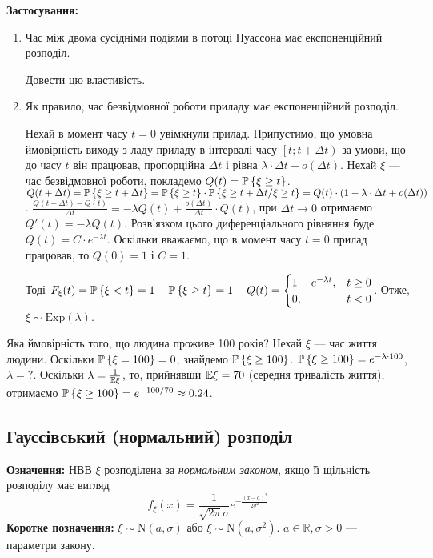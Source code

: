 \noindent\textbf{Застосування:}
\begin{enumerate}
    \item Час між двома сусідніми подіями в потоці Пуассона має експоненційний розподіл.
    \begin{exercise}
        Довести цю властивість.
    \end{exercise}
    \item Як правило, час безвідмовної роботи приладу має експоненційний розподіл.
    
    Нехай в момент часу $t=0$ увімкнули прилад. Припустимо, що умовна ймовірність виходу з ладу
    приладу в інтервалі часу $\left[ t; t+\Delta t\right)$ за умови, що до часу $t$ він працював,
    пропорційна $\Delta t$ і рівна $\lambda\cdot \Delta t + o(\Delta t)$. Нехай $\xi$ --- час безвідмовної роботи,
    покладемо $Q(t) = \P\left\{\xi \geq t\right\}$.
    $Q(t+\Delta t) = \P\left\{\xi \geq t + \Delta t\right\} = \P\left\{\xi \geq t\right\} \cdot \P\left\{\xi \geq t+\Delta t / \xi \geq t\right\} = 
    Q(t) \cdot (1 - \lambda\cdot \Delta t + o(\Delta t))$.
    $\frac{Q(t+\Delta t) - Q(t)}{\Delta t} = -\lambda Q(t) + \frac{o(\Delta t)}{\Delta t} \cdot Q(t)$,
    при $\Delta t \rightarrow 0$ отримаємо $Q'(t) = -\lambda Q(t)$.
    Розв'язком цього диференціального рівняння буде $Q(t) = C\cdot e^{-\lambda t}$.
    Оскільки вважаємо, що в момент часу $t=0$ прилад працював, то $Q(0) = 1$ і $C=1$.

    Тоді $F_\xi(t) = \P\left\{ \xi < t\right\} = 1 - \P\left\{ \xi \geq t\right\} = 1 - Q(t) = \begin{cases}
        1 - e^{-\lambda t}, & t \geq 0 \\
        0, & t < 0
    \end{cases}$. Отже, $\xi \sim \mathrm{Exp}(\lambda)$.
\end{enumerate}

\begin{example}
    Яка ймовірність того, що людина проживе 100 років? Нехай $\xi$ --- час життя людини.
    Оскільки $\P\left\{\xi = 100\right\} = 0$, знайдемо $\P\left\{ \xi \geq 100\right\}$.
    $\P\left\{ \xi \geq 100\right\} = e^{-\lambda \cdot 100}$, $\lambda = \text{?}$.
    Оскільки $\lambda = \frac{1}{\E\xi}$, то, прийнявши $\E\xi = 70$ (середня тривалість життя),
    отримаємо $\P\left\{ \xi \geq 100\right\} = e^{-100/70} \approx 0.24$.
\end{example}

\subsection{Гауссівський (нормальний) розподіл}
\noindent\textbf{Означення:}
    НВВ $\xi$ розподілена за \emph{нормальним законом}, 
    якщо її щільність розподілу має вигляд 
    \begin{equation}
        f_\xi(x) = \frac{1}{\sqrt{2\pi}\sigma} e^{-\frac{(x-a)^2}{2\sigma^2}}
    \end{equation}
\textbf{Коротке позначення:} $\xi \sim \mathrm{N}(a, \sigma)$ або 
    $\xi \sim \mathrm{N}(a, \sigma^2)$.
    $a \in \mathbb{R}, \sigma > 0$ --- параметри закону.

